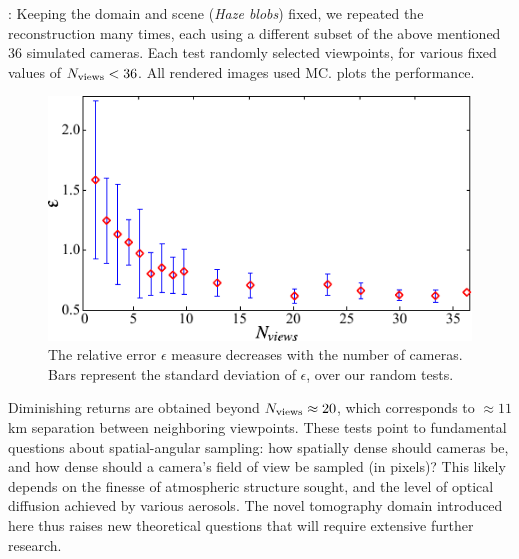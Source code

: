\documentclass[10pt,letterpaper]{article}
\newcommand{\yoavcomment}[1]{}
\renewcommand{\yoavcomment}[1]{#1} %
\begin{document}
: Keeping the domain and scene ({\em Haze blobs}) fixed, we
repeated the reconstruction many times, each using a different subset of the above mentioned
36 simulated cameras. Each test randomly selected viewpoints, for various fixed values
of $N_{\rm views}< 36$. All rendered images used MC.
 plots the performance.
\begin{figure}[t]
  \centering
  \yoavcomment{\includegraphics{images/error_vs_cameras.pdf}}
  \caption{\small The relative error $\epsilon$ measure decreases with the number of
    cameras. Bars represent the standard deviation of $\epsilon$, over our random tests.}
  \label{fig:error_vs_cameras}
\end{figure}
Diminishing returns are obtained beyond $N_{\rm views}\approx 20$, which corresponds to $\approx 11$km
separation between neighboring viewpoints. These tests point to fundamental questions about
spatial-angular sampling: how spatially dense should cameras be, and how dense should a
camera's field of view be sampled (in pixels)? This likely depends on the finesse of
atmospheric structure sought, and the level of optical diffusion achieved by various
aerosols. The novel tomography domain introduced here thus raises new theoretical questions
that will   require extensive further research.\\
\end{document}
